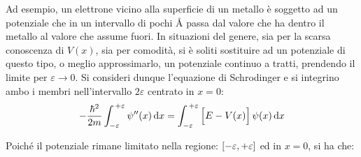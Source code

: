 \begin{minipage}{0.4\textwidth}
	Ad esempio, un elettrone vicino alla superficie di un metallo è soggetto ad un potenziale che in un intervallo di pochi Å passa dal valore che ha dentro il metallo al valore che assume fuori. In situazioni del genere, sia per la scarsa conoscenza di $V(x)$, sia per comodità, si è soliti sostituire ad un potenziale di questo tipo, o meglio approssimarlo, un potenziale continuo a tratti, prendendo il limite per $\varepsilon \to 0$. Si consideri dunque l’equazione di Schrodinger e si integrino ambo i membri nell’intervallo $2\varepsilon$ centrato in $x = 0$:
\begin{align*}
	- \frac{\hbar^2}{2m} \int_{-\varepsilon}^{\, + \varepsilon} \psi''(x) \, \dd x = \int_{-\varepsilon}^{\, + \varepsilon} \qty\Big[E - V(x)] \,  \psi(x) \, \dd x 
\end{align*}
\end{minipage}
	\hfill
\begin{minipage}{0.5\textwidth}


\end{minipage}
\vspace{1em}

	Poiché il potenziale rimane limitato nella regione: $\qty[- \varepsilon, + \varepsilon]$ ed in $x = 0$, si ha che:
	

